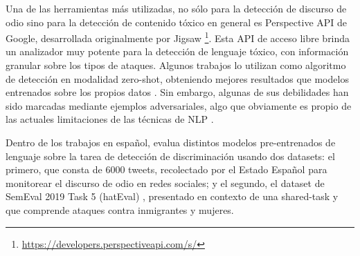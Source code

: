 Una de las herramientas más utilizadas, no sólo para la detección de discurso de odio sino para la detección de contenido tóxico en general es Perspective API de Google, desarrollada originalmente por Jigsaw \footnote{\url{https://developers.perspectiveapi.com/s/}}. Esta API de acceso libre brinda un analizador muy potente para la detección de lenguaje tóxico, con información granular sobre los tipos de ataques. Algunos trabajos lo utilizan como algoritmo de detección en modalidad zero-shot, obteniendo mejores resultados que modelos entrenados sobre los propios datos \cite{pavlopoulos2020toxicity}. Sin embargo, algunas de sus debilidades han sido marcadas mediante ejemplos adversariales, algo que obviamente es propio de las actuales limitaciones de las técnicas de NLP \cite{hosseini2017deceiving,jain2018adversarial}.

Dentro de los trabajos en español, \citet{plaza2021pretrained} evalua distintos modelos pre-entrenados de lenguaje sobre la tarea de detección de discriminación usando dos datasets: el primero, \citet{pereira2019detecting} que consta de 6000 tweets, recolectado por el Estado Español para monitorear el discurso de odio en redes sociales; y el segundo, el dataset de SemEval 2019 Task 5 (hatEval) \cite{hateval2019semeval}, presentado en contexto de una shared-task y que comprende ataques contra inmigrantes y mujeres.


